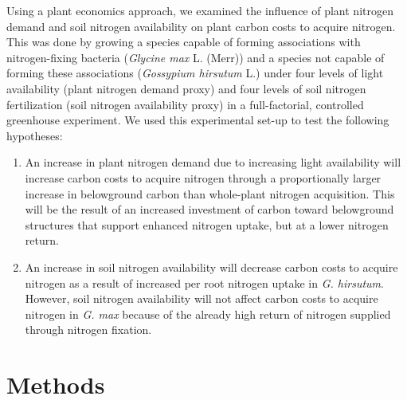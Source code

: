 Using a plant economics approach, we examined the influence of plant nitrogen demand and soil nitrogen availability on plant carbon costs to acquire nitrogen. This was done by growing
a species capable of forming associations with nitrogen-fixing bacteria (\textit{Glycine max} L. (Merr)) and a species not capable of forming these associations (\textit{Gossypium hirsutum} L.) under four levels of light availability (plant nitrogen demand proxy) and four levels of soil nitrogen fertilization (soil nitrogen availability proxy) in a full-factorial, controlled greenhouse experiment. We used this experimental set-up to test the following hypotheses:
\begin{enumerate}
\item An increase in plant nitrogen demand due to increasing light availability will increase carbon costs to acquire nitrogen through a proportionally larger increase in belowground carbon than whole-plant nitrogen acquisition. This will be the result of an increased investment of carbon toward belowground structures that support enhanced nitrogen uptake, but at a lower nitrogen return. 

\item An increase in soil nitrogen availability will decrease carbon costs to acquire nitrogen as a result of increased per root nitrogen uptake in \textit{G. hirsutum}. However, soil nitrogen availability will not affect carbon costs to acquire nitrogen in \textit{G. max} because of the already high return of nitrogen supplied through nitrogen fixation.

\end{enumerate}

\section{Methods}
